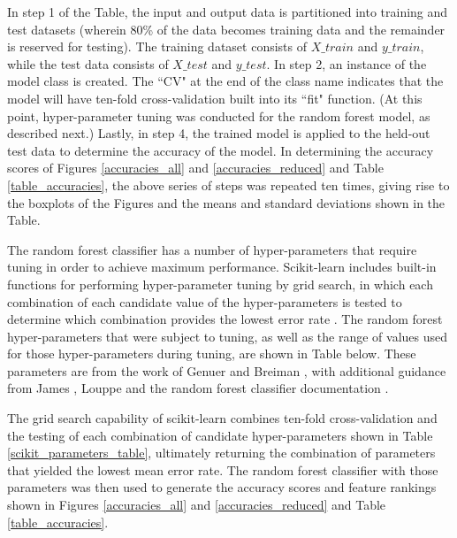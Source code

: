 In step 1 of the Table, the input and output data is partitioned into training and test datasets (wherein 80\% of the data becomes training data and the remainder is reserved for testing).  The training dataset consists of $X\_train$ and $y\_train$, while the test data consists of $X\_test$ and $y\_test$.  In step 2, an instance of the model class is created.  The ``CV" at the end of the class name indicates that the model will have ten-fold cross-validation built into its ``fit" function.  (At this point, hyper-parameter tuning was conducted for the random forest model, as described next.)  Lastly, in step 4, the trained model is applied to the held-out test data to determine the accuracy of the model.  In determining the accuracy scores of Figures \ref{accuracies_all} and \ref{accuracies_reduced} and Table \ref{table_accuracies}, the above series of steps was repeated ten times, giving rise to the boxplots of the Figures and the means and standard deviations shown in the Table.

The random forest classifier has a number of hyper-parameters that require tuning in order to achieve maximum performance.  Scikit-learn includes built-in functions for performing hyper-parameter tuning by grid search, in which each combination of each candidate value of the hyper-parameters is tested to determine which combination provides the lowest error rate \cite{scikitlearn}.  The random forest hyper-parameters that were subject to tuning, as well as the range of values used for those hyper-parameters during tuning, are shown in Table below.  These parameters are from the work of Genuer \cite{Genuer} and Breiman \cite{Breiman}, with additional guidance from James \cite{Hastie}, Louppe \cite{Louppe} and the random forest classifier documentation \cite{scikitlearn}. 

The grid search capability of scikit-learn \cite{scikitlearn} combines ten-fold cross-validation and the testing of each combination of candidate hyper-parameters shown in Table \ref{scikit_parameters_table}, ultimately returning the combination of parameters that yielded the lowest mean error rate.  The random forest classifier with those parameters was then used to generate the accuracy scores and feature rankings shown in Figures \ref{accuracies_all} and \ref{accuracies_reduced} and Table \ref{table_accuracies}.

